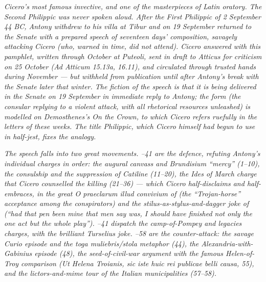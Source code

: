 
\textit{Cicero's most famous invective, and one of the
masterpieces of Latin oratory. The Second Philippic was never
spoken aloud. After the First Philippic of 2 September 44 BC,
Antony withdrew to his villa at Tibur and on 19 September
returned to the Senate with a prepared speech of seventeen
days' composition, savagely attacking Cicero (who, warned in
time, did not attend). Cicero answered with this pamphlet,
written through October at Puteoli, sent in draft to Atticus
for criticism on 25 October (\textit{Ad Atticum} 15.13a, 16.11),
and circulated through trusted hands during November --- but
withheld from publication until after Antony's break with the
Senate later that winter. The fiction of the speech is that it
is being delivered in the Senate on 19 September in immediate
reply to Antony; the form (the consular replying to a violent
attack, with all rhetorical resources unleashed) is modelled on
Demosthenes's \textit{On the Crown}, to which Cicero refers
ruefully in the letters of these weeks. The title
\textit{Philippic}, which Cicero himself had begun to use in
half-jest, fixes the analogy.}

\textit{The speech falls into two great movements. --41 are the defence, refuting Antony's individual charges in
order: the augural canvass and Brundisium ``mercy'' (1--10), the
consulship and the suppression of Catiline (11--20), the Ides of
March charge that Cicero counselled the killing (21--36) ---
which Cicero half-disclaims and half-embraces, in the great
\textit{O praeclarum illud convivium} of  (the
``Trojan-horse'' acceptance among the conspirators) and the
\textit{stilus}-as-stylus-and-dagger joke of 
(``had that pen been mine that men say was, I should have
finished not only the one act but the whole play''). --41 dispatch the camp-of-Pompey and legacies charges, with
the brilliant Turselius joke. --58 are the
counter-attack: the savage Curio episode and the \textit{toga
muliebris}/\textit{stola} metaphor (44), the
Alexandria-with-Gabinius episode (48), the seed-of-civil-war
argument with the famous Helen-of-Troy comparison
(\textit{Ut Helena Troianis, sic iste huic rei publicae belli
causa}, 55), and the lictors-and-mime tour of the Italian
municipalities (57--58).}

